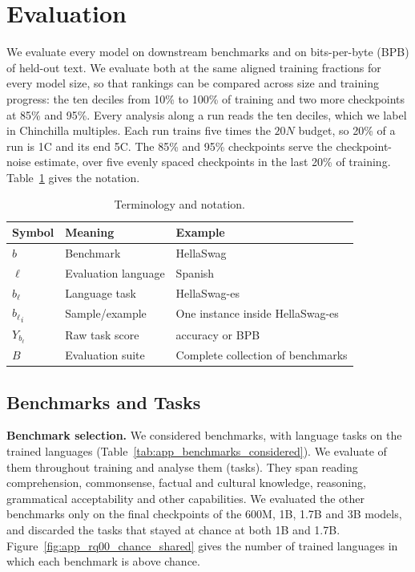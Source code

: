 \section{Evaluation}
\label{app:evaluation}
\label{app:evaluation-protocol}

We evaluate every model on downstream benchmarks and on bits-per-byte (BPB) of held-out text. We evaluate both at the same aligned training fractions for every model size, so that rankings can be compared across size and training progress: the ten deciles from 10\% to 100\% of training and two more checkpoints at 85\% and 95\%. Every analysis along a run reads the ten deciles, which we label in Chinchilla multiples. Each run trains five times the $20N$ budget, so 20\% of a run is 1C and its end 5C. The 85\% and 95\% checkpoints serve the checkpoint-noise estimate, over five evenly spaced checkpoints in the last 20\% of training. Table~\ref{tab:notation-evals} gives the notation.

\begin{table}[th]
    \centering
    \begin{tabular}{lll}
        \toprule
        \textbf{Symbol} & \textbf{Meaning} & \textbf{Example} \\
        \hline
        \(b\) & Benchmark & HellaSwag \\
        \hline
        \(\ell\) & Evaluation language & Spanish \\
        \hline
        \(b_\ell\) & Language task & HellaSwag-es \\
        \hline
        \({b_\ell}_i\) & Sample/example & One instance inside HellaSwag-es \\
        \hline
        \(Y_{b_\ell}\) & Raw task score & accuracy or BPB \\
        \hline
        \(B\) & Evaluation suite & Complete collection of benchmarks \\
        \bottomrule
    \end{tabular}
    \caption{Terminology and notation.}
    \label{tab:notation-evals}
\end{table}

\subsection{Benchmarks and Tasks}
\label{app:benchmarks}

\textbf{Benchmark selection.} We considered \nbenchconsidered benchmarks, with \ntasksconsidered language tasks on the trained languages (Table~\ref{tab:app_benchmarks_considered}). We evaluate \nbenchanalysed of them throughout training and analyse them (\ntasksanalysed tasks). They span reading comprehension, commonsense, factual and cultural knowledge, reasoning, grammatical acceptability and other capabilities. We evaluated the other benchmarks only on the final checkpoints of the 600M, 1B, 1.7B and 3B models, and discarded the \ntasksdiscarded tasks that stayed at chance at both 1B and 1.7B. Figure~\ref{fig:app_rq00_chance_shared} gives the number of trained languages in which each benchmark is above chance.


